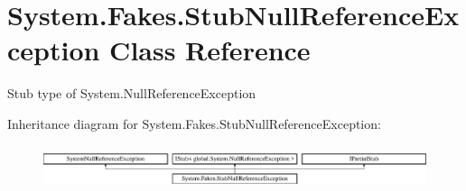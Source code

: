 \hypertarget{class_system_1_1_fakes_1_1_stub_null_reference_exception}{\section{System.\-Fakes.\-Stub\-Null\-Reference\-Exception Class Reference}
\label{class_system_1_1_fakes_1_1_stub_null_reference_exception}
}


Stub type of System.\-Null\-Reference\-Exception 


Inheritance diagram for System.\-Fakes.\-Stub\-Null\-Reference\-Exception\-:\begin{figure}[H]
\begin{center}
\leavevmode
\includegraphics[height=1.287356cm]{class_system_1_1_fakes_1_1_stub_null_reference_exception}
\end{center}
\end{figure}
